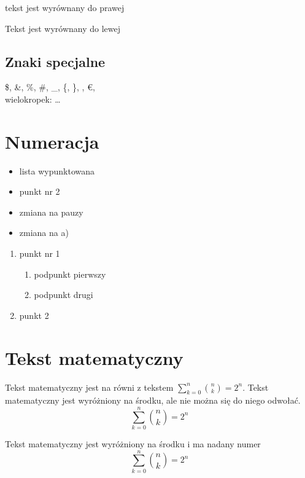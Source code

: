 \documentclass[12pt,a4paper,twoside]{report}
\theoremstyle{definition} %
\begin{document}
	\begin{flushright}
		tekst jest wyrównany do prawej
	\end{flushright}
	
	\begin{flushleft}
		Tekst jest wyrównany do lewej
	\end{flushleft}
	
	\subsection{Znaki specjalne}
	\$, \&, \%, \#, \_, \{, \}, \texteuro, \euro, \\
	wielokropek: \ldots
	
	\section{Numeracja}
	
	\begin{itemize}
		\item lista wypunktowana
		\item punkt nr 2	
	\end{itemize}
	
	\begin{itemize}
		\item[--] zmiana na pauzy
		\item[a)] zmiana na a)
	\end{itemize}
	
	\begin{enumerate}
		\item punkt nr 1\begin{enumerate}
			\item podpunkt pierwszy
			\item podpunkt drugi
		\end{enumerate}
		\item punkt 2
	\end{enumerate}
	
	\section{Tekst matematyczny}
	Tekst matematyczny jest na równi z tekstem $\sum\limits_{k=0}^n {{n}\choose{k}}=2^n$.
	\newline
	Tekst matematyczny jest wyróżniony na środku, ale nie można się do niego odwołać.
	$$\sum\limits_{k=0}^n {{n}\choose{k}}=2^n$$
	
	Tekst matematyczny jest wyróżniony na środku i ma nadany numer
	\begin{equation}\label{wzór}
		\sum\limits_{k=0}^n {{n}\choose{k}}=2^n
	\end{equation}
	
\end{document}
